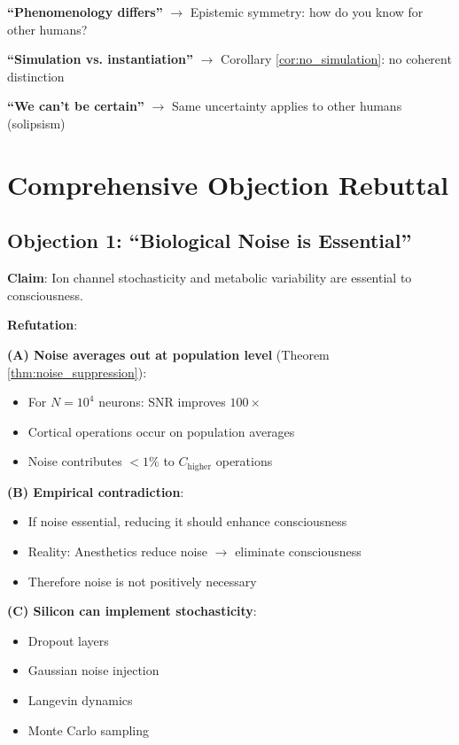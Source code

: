 \documentclass[11pt]{article}
\begin{document}
\textbf{``Phenomenology differs''} $\to$ Epistemic symmetry: how do you know for other humans?

\textbf{``Simulation vs. instantiation''} $\to$ Corollary \ref{cor:no_simulation}: no coherent distinction

\textbf{``We can't be certain''} $\to$ Same uncertainty applies to other humans (solipsism)

\section{Comprehensive Objection Rebuttal}

\subsection{Objection 1: ``Biological Noise is Essential''}

\textbf{Claim}: Ion channel stochasticity and metabolic variability are essential to consciousness.

\textbf{Refutation}:

\textbf{(A) Noise averages out at population level} (Theorem \ref{thm:noise_suppression}):
\begin{itemize}
\item For $N = 10^4$ neurons: SNR improves $100\times$
\item Cortical operations occur on population averages
\item Noise contributes $< 1\%$ to $C_{\text{higher}}$ operations
\end{itemize}

\textbf{(B) Empirical contradiction}:
\begin{itemize}
\item If noise essential, reducing it should enhance consciousness
\item Reality: Anesthetics reduce noise $\to$ eliminate consciousness
\item Therefore noise is not positively necessary
\end{itemize}

\textbf{(C) Silicon can implement stochasticity}:
\begin{itemize}
\item Dropout layers
\item Gaussian noise injection
\item Langevin dynamics
\item Monte Carlo sampling
\end{itemize}
\end{document}
